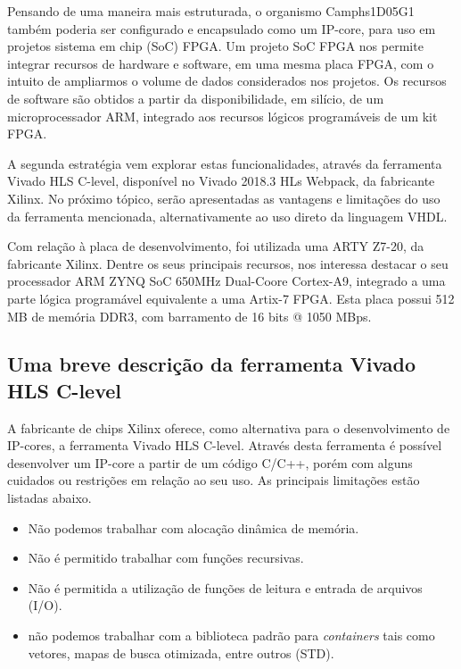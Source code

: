Pensando de uma maneira mais estruturada, o organismo Camphs1D05G1 também poderia ser configurado e encapsulado como um IP-core, para uso em projetos sistema em chip (SoC) FPGA. Um projeto SoC FPGA nos permite integrar recursos de hardware e software, em uma mesma placa FPGA, com o intuito de ampliarmos o volume de dados considerados nos projetos. Os recursos de software são obtidos a partir da disponibilidade, em silício, de um microprocessador ARM, integrado aos recursos lógicos programáveis de um kit FPGA.

A segunda estratégia vem explorar estas funcionalidades, através da ferramenta Vivado HLS C-level, disponível no  Vivado 2018.3 HLs Webpack, da fabricante Xilinx. No próximo tópico, serão apresentadas as vantagens e limitações do uso da ferramenta mencionada, alternativamente ao uso direto da linguagem VHDL. 

Com relação à placa de desenvolvimento, foi utilizada uma ARTY Z7-20, da fabricante Xilinx. Dentre os seus principais recursos, nos interessa destacar o seu processador ARM ZYNQ SoC 650MHz Dual-Coore Cortex-A9, integrado a uma parte lógica programável equivalente a uma Artix-7 FPGA. Esta placa possui 512 MB de memória DDR3, com barramento de 16 bits @ 1050 MBps.

\subsection{Uma breve descrição da ferramenta Vivado HLS C-level}

A fabricante de chips Xilinx oferece, como alternativa para o desenvolvimento de IP-cores, a ferramenta Vivado HLS C-level. Através desta ferramenta é possível desenvolver um IP-core a partir de um código C/C++, porém com alguns cuidados ou restrições em relação ao seu uso. As principais limitações estão listadas abaixo.

\begin{itemize}
  \item Não podemos trabalhar com alocação dinâmica de memória.
  \item Não é permitido trabalhar com funções recursivas.
  \item Não é permitida a utilização de funções de leitura e entrada de arquivos (I/O).
  \item não podemos trabalhar com a biblioteca padrão para \textit{containers} tais como vetores, mapas de busca otimizada, entre outros (STD).
\end{itemize}


